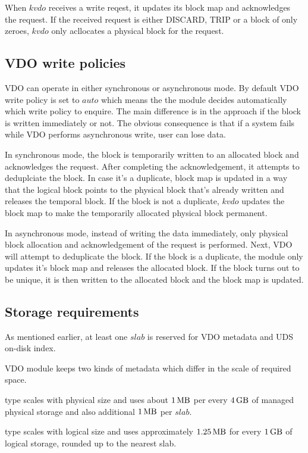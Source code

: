 \documentclass[
  color, %
  table, %
  lof,   %
  lot,   %
]{fithesis3}
\begin{document}
When $kvdo$ receives a write reqest, it updates its block map and acknowledges the request. If the received request is either DISCARD, TRIP or a block of only zeroes, $kvdo$ only acllocates a physical block for the request.

\subsection{VDO write policies}
VDO can operate in either synchronous or asynchronous mode. By default VDO write policy is set to $auto$ which means the the module decides automatically which write policy to enquire. The main difference is in the approach if the block is written immediately or not. The obvious consequence is that if a system fails while VDO performs asynchronous write, user can lose data.

In synchronous mode, the block is temporarily written to an allocated block and acknowledges the request. After completing the acknowledgement, it attempts to deduplciate the block. In case it's a duplicate, block map is updated in a way that the logical block points to the physical block that's already written and releases the temporal block. If the block is not a duplicate, $kvdo$ updates the block map to make the temporarily allocated physical block permanent.

In asynchronous mode, instead of writing the data immediately, only physical block allocation and acknowledgement of the request is performed. Next, VDO will attempt to deduplicate the block. If the block is a duplicate, the module only updates it's block map and releases the allocated block. If the block turns out to be unique, it is then written to the allocated block and the block map is updated.

\subsection{Storage requirements}
As mentioned earlier, at least one $slab$ is reserved for VDO metadata and UDS on-disk index.

VDO module keeps two kinds of metadata which differ in the scale of required space.
\begin{compactenum}
\item type scales with physical size and uses about $\SI{1}{\mega\byte}$ per every $\SI{4}{\giga\byte}$ of managed physical storage and also additional $\SI{1}{\mega\byte}$ per $slab$. 
\item type scales with logical size and uses approximately $\SI{1.25}{\mega\byte}$ for every $\SI{1}{\giga\byte}$ of logical storage, rounded up to the nearest slab.
\end{compactenum}
\end{document}
